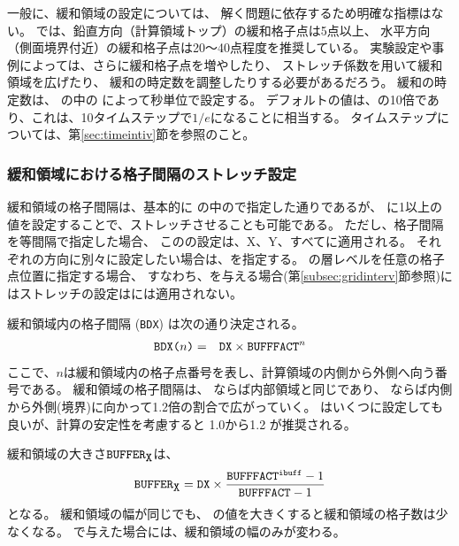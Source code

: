 一般に、緩和領域の設定については、
解く問題に依存するため明確な指標はない。
\scalerm では、鉛直方向（計算領域トップ）の緩和格子点は5点以上、
水平方向（側面境界付近）の緩和格子点は20〜40点程度を推奨している。
実験設定や事例によっては、さらに緩和格子点を増やしたり、
ストレッチ係数を用いて緩和領域を広げたり、
緩和の時定数を調整したりする必要があるだろう。
緩和の時定数は、
の中の
によって秒単位で設定する。
デフォルトの値は、の10倍であり、これは、10タイムステップで$1/e$になることに相当する。
タイムステップについては、第\ref{sec:timeintiv}節を参照のこと。

\subsubsection{緩和領域における格子間隔のストレッチ設定}

緩和領域の格子間隔は、基本的に
の中ので指定した通りであるが、
に1以上の値を設定することで、ストレッチさせることも可能である。
ただし、格子間隔を等間隔で指定した場合、
このの設定は、X、Y、{\ZDIR}すべてに適用される。
それぞれの方向に別々に設定したい場合は、を指定する。
{\ZDIR}の層レベルを任意の格子点位置に指定する場合、
すなわち、を与える場合(第\ref{subsec:gridinterv}節参照)にはストレッチの設定は{\ZDIR}には適用されない。

緩和領域内の格子間隔 (\verb|BDX|) は次の通り決定される。
\begin{eqnarray}
 \verb|BDX(|n\verb|)| &=& \verb|DX| \times \verb|BUFFFACT|^n \nonumber
\end{eqnarray}
ここで、$n$は緩和領域内の格子点番号を表し、計算領域の内側から外側へ向う番号である。
緩和領域の格子間隔は、
ならば内部領域と同じであり、
ならば内側から外側(境界)に向かって1.2倍の割合で広がっていく。
はいくつに設定しても良いが、計算の安定性を考慮すると 1.0から1.2 が推奨される。


緩和領域の大きさ$\verb|BUFFER|_{\verb|X|}$は、
\[
  \verb|BUFFER|_{\verb|X|} = \nmitemeq{DX} \times \frac{ \nmitemeq{BUFFFACT}^{\texttt{\detokenize{ibuff}}}-1}{ \nmitemeq{BUFFFACT}-1 }
\]
となる。
%
緩和領域の幅が同じでも、
の値を大きくすると緩和領域の格子数は少なくなる。
で与えた場合には、緩和領域の幅のみが変わる。

